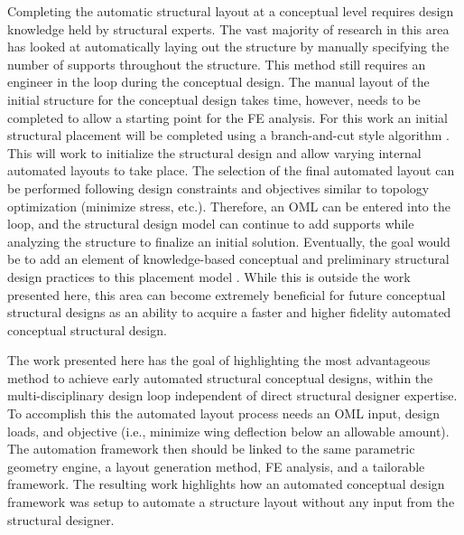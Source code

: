 \documentclass[conf]{new-aiaa}
\begin{document}
Completing the automatic structural layout at a conceptual level 
requires design knowledge held by structural experts. 
The vast majority of research in this area has looked at automatically 
laying out the structure by manually specifying the number of supports 
throughout the structure. 
This method still requires an engineer in the loop during the conceptual design. 
The manual layout of the initial structure for the conceptual design takes time, 
however, needs to be completed to allow a starting point for the FE analysis. 
For this work an initial structural placement will be completed using 
a branch-and-cut style algorithm
\cite{padberg_branch_and_cut_algorithm_for_resolution_of_sym_traveling_salesman}.
This will work to initialize the structural design and allow varying 
internal automated layouts to take place. 
The selection of the final automated layout can be performed following 
design constraints and objectives similar to topology 
optimization (minimize stress, etc.). 
Therefore, an OML can be entered into the loop, 
and the structural design model can continue to add supports while 
analyzing the structure to finalize an initial solution. 
Eventually, the goal would be to add an element of knowledge-based 
conceptual and preliminary structural design practices to this 
placement model 
\cite{anemaat_AAARaven_knowledge_based_aircraft_conceptual_and_prelim_design,
      niu_airframe_structural_design_practical_design_info_and_data_on_aircraft,
      sensmier_study_of_vehicle_structural_layouts_post_WWII_aircraft}.
While this is outside the work presented here, 
this area can become extremely beneficial for future conceptual 
structural designs as an ability to acquire a faster and higher 
fidelity automated conceptual structural design. 

The work presented here has the goal of highlighting the most 
advantageous method to achieve early automated structural conceptual 
designs, within the multi-disciplinary design loop 
independent of direct structural designer expertise. 
To accomplish this the automated layout process needs an OML input, 
design loads, and objective (i.e., minimize wing deflection below an allowable amount). 
The automation framework then should be linked to the same parametric geometry 
engine, a layout generation method, FE analysis, and a tailorable framework. 
The resulting work highlights how an 
automated conceptual design framework was setup to automate a 
structure layout without any input from the structural designer. 
\end{document}
